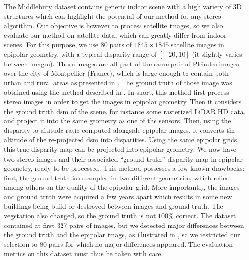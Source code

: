 The Middlebury dataset contains generic indoor scene with a high variety of 3D structures which can highlight the potential of our method for any stereo algorithm. Our objective is however to process satellite images, so we also evaluate our method on satellite data, which can greatly differ from indoor scenes. For this purpose, we use 80 pairs of $1845\times1845$ satellite images in epipolar geometry, with a typical disparity range of $[-20, 10]$ (it slightly varies between images). Those images are all part of the same pair of Pléiades images over the city of Montpellier (France), which is large enough to contain both urban and rural areas as presented in . The ground truth of those image was obtained using the method described in \cite{cournet_ground_2020}. In short, this method first process stereo images in order to get the images in epipolar geometry. Then it considers the ground truth \acrshort{dsm} of the scene, for instance some rasterized LiDAR HD data, and project it into the same geometry as one of the sensors. Then, using the disparity to altitude ratio computed alongside epipolar images, it converts the altitude of the re-projected \acrshort{dsm} into disparities. Using the same epipolar grids, this true disparity map can be projected into epipolar geometry. We now have two stereo images and their associated ``ground truth'' disparity map in epipolar geometry, ready to be processed. This method possesses a few known drawbacks: first, the ground truth is resampled in two different geometries, which relies among others on the quality of the epipolar grid. More importantly, the images and ground truth were acquired a few years apart which results in some new buildings being build or destroyed between images and ground truth. The vegetation also changed, so the ground truth is not $100\%$ correct. The dataset contained at first 327 pairs of images, but we detected major differences between the ground truth and the epipolar image, as illustrated in , so we restricted our selection to 80 pairs for which no major differences appeared. The evaluation metrics on this dataset must thus be taken with care.


